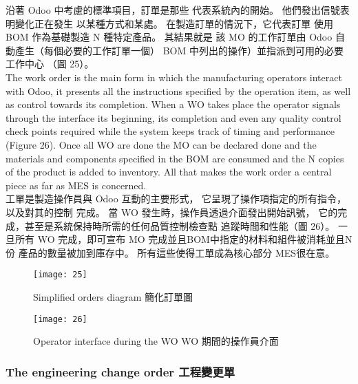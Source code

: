 \fontsize{12}{2.5pt}\sectionef  
{沿著 Odoo 中考慮的標準項目，訂單是那些
代表系統內的開始。 他們發出信號表明變化正在發生
以某種方式和某處。 在製造訂單的情況下，它代表訂單
使用 BOM 作為基礎製造 N 種特定產品。 其結果就是
該 MO 的工作訂單由 Odoo 自動產生（每個必要的工作訂單一個）
BOM 中列出的操作）並指派到可用的必要工作中心
（圖 25）。}\\[15pt]

\fontsize{12}{2.5pt}\sectionef 
 {The work order is the main form in which the manufacturing operators interact with Odoo,
it presents all the instructions specified by the operation item, as well as control towards its
completion. When a WO takes place the operator signals through the interface its beginning,
its completion and even any quality control check points required while the system keeps
track of timing and performance (Figure 26). Once all WO are done the MO can be declared
done and the materials and components specified in the BOM are consumed and the N copies
of the product is added to inventory. All that makes the work order a central piece as far as
MES is concerned.  }\\[1pt]

\fontsize{12}{2.5pt}\sectionef  
{工單是製造操作員與 Odoo 互動的主要形式，
它呈現了操作項指定的所有指令，以及對其的控制
完成。 當 WO 發生時，操作員透過介面發出開始訊號，
它的完成，甚至是系統保持時所需的任何品質控制檢查點
追蹤時間和性能（圖 26）。 一旦所有 WO 完成，即可宣布 MO
完成並且BOM中指定的材料和組件被消耗並且N份
產品的數量被加到庫存中。 所有這些使得工單成為核心部分
MES很在意。}\\[15pt]

\begin{figure}[hbt!]
\begin{center}
\texttt{[image: 25]}
\caption{\Large Simplified orders diagram  簡化訂單圖}\label{fig.25}
\end{center}
\end{figure}

\begin{figure}[hbt!]
\begin{center}
\texttt{[image: 26]}
\caption{\Large Operator interface during the WO  WO 期間的操作員介面}\label{fig.26}
\end{center}
\end{figure}


\subsubsection{ The engineering change order 工程變更單 }

